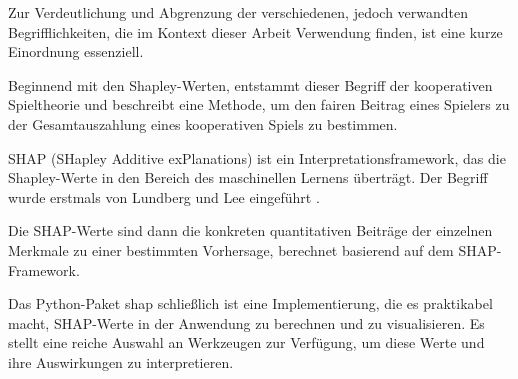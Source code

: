 Zur Verdeutlichung und Abgrenzung der verschiedenen, jedoch verwandten Begrifflichkeiten, die im Kontext dieser Arbeit Verwendung finden, 
ist eine kurze Einordnung essenziell.

Beginnend mit den Shapley-Werten, entstammt dieser Begriff der kooperativen Spieltheorie und beschreibt eine Methode, 
um den fairen Beitrag eines Spielers zu der Gesamtauszahlung eines kooperativen Spiels zu bestimmen. 

SHAP (SHapley Additive exPlanations) ist ein Interpretationsframework, das die Shapley-Werte in den Bereich des maschinellen Lernens überträgt. 
Der Begriff wurde erstmals von Lundberg und Lee eingeführt \cite[S. 1]{NIPS2017_8a20a862}.

Die SHAP-Werte sind dann die konkreten quantitativen Beiträge der einzelnen Merkmale zu einer bestimmten Vorhersage, 
berechnet basierend auf dem SHAP-Framework.

Das Python-Paket \textsf{shap} schließlich ist eine Implementierung, die es praktikabel macht, SHAP-Werte in der Anwendung zu berechnen 
und zu visualisieren. Es stellt eine reiche Auswahl an Werkzeugen zur Verfügung, um diese Werte und ihre Auswirkungen zu interpretieren.